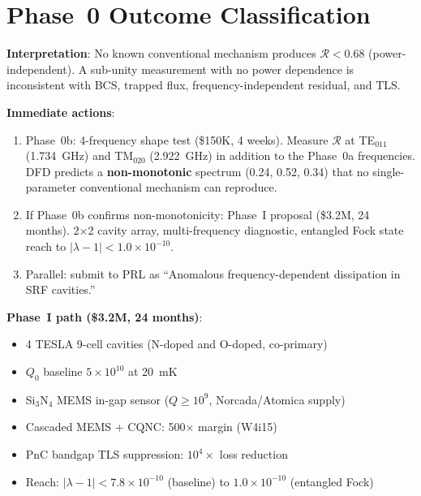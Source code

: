 \documentclass[11pt]{article}
\newcommand{\ee}[1]{\times 10^{#1}}
\newcommand{\lbone}{|\lambda - 1|}
\newcommand{\Rq}{\mathcal{R}}
\begin{document}
\section{Phase~0 Outcome Classification}
\label{sec:outcomes}

\begin{tcolorbox}[colback=green!5!white, colframe=green!60!black,
  title=\textbf{OUTCOME A: ANOMALY DETECTED ($\Rq_{\rm meas} < 1.0$
  at $>2\sigma$)}]

\textbf{Interpretation}: No known conventional mechanism produces
$\Rq < 0.68$ (power-independent). A sub-unity measurement with no
power dependence is inconsistent with BCS, trapped flux,
frequency-independent residual, and TLS.

\textbf{Immediate actions}:
\begin{enumerate}[nosep]
\item Phase~0b: 4-frequency shape test (\$150K, 4 weeks). Measure
  $\Rq$ at TE$_{011}$ (1.734~GHz) and TM$_{020}$ (2.922~GHz) in
  addition to the Phase~0a frequencies. DFD predicts a
  \textbf{non-monotonic} spectrum (0.24, 0.52, 0.34) that no
  single-parameter conventional mechanism can reproduce.
\item If Phase~0b confirms non-monotonicity: Phase~I proposal
  (\$3.2M, 24 months). 2$\times$2 cavity array, multi-frequency
  diagnostic, entangled Fock state reach to $\lbone < 1.0\ee{-10}$.
\item Parallel: submit to PRL as ``Anomalous frequency-dependent
  dissipation in SRF cavities.''
\end{enumerate}

\textbf{Phase~I path (\$3.2M, 24 months)}:
\begin{itemize}[nosep]
\item 4 TESLA 9-cell cavities (N-doped and O-doped, co-primary)
\item $Q_0$ baseline $5\ee{10}$ at 20~mK
\item Si$_3$N$_4$ MEMS in-gap sensor ($Q \geq 10^9$, Norcada/Atomica supply)
\item Cascaded MEMS + CQNC: 500$\times$ margin (W4i15)
\item PnC bandgap TLS suppression: $10^4\times$ loss reduction
\item Reach: $\lbone < 7.8\ee{-10}$ (baseline) to $1.0\ee{-10}$
  (entangled Fock)
\end{itemize}
\end{tcolorbox}
\end{document}
